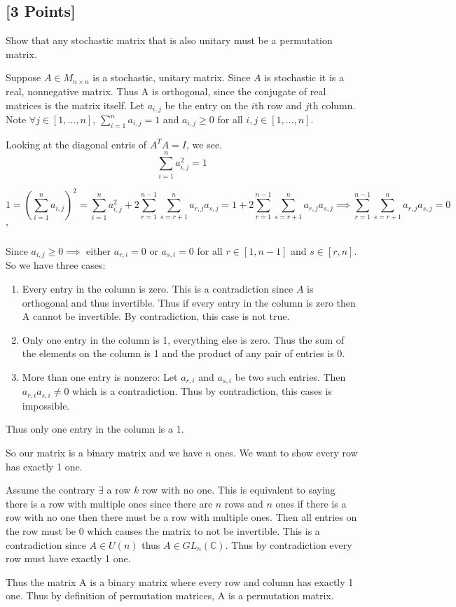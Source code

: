 \documentclass[11pt]{article}
\begin{document}
\subsection{[3 Points]} Show that any stochastic matrix that is also unitary must be a permutation matrix. 

\begin{solution}
	Suppose $A \in M_{n \times n}$ is a stochastic, unitary matrix. Since $A$ is stochastic it is a real, nonnegative matrix. Thus A is orthogonal, since the conjugate of real matrices is the matrix itself. Let $a_{i, j}$ be the entry on the $i$th row and $j$th column. Note $\forall j \in [1, \dots, n]$, $\sum_{i = 1}^{n} a_{i, j} = 1$ and $a_{i, j} \geq 0$ for all $i, j \in [1, \dots, n]$. 
	
	Looking at the diagonal entris of $A^T A = I$, we see.  
	\[\sum_{i = 1}^n a^2_{i, j} = 1\]

	\[1 = \left(\sum_{i = 1}^{n} a_{i, j}\right)^2 = \sum_{i = 1}^n a^2_{i, j} + 2\sum_{r = 1}^{n - 1} \sum_{s = r + 1}^{n} a_{r, j} a_{s, j} = 1 + 2\sum_{r = 1}^{n - 1} \sum_{s = r + 1}^{n} a_{r, j} a_{s, j} \implies \sum_{r = 1}^{n - 1} \sum_{s = r + 1}^{n} a_{r, j} a_{s, j} = 0\]'

	Since $a_{i, j} \geq 0 \implies $ either $a_{r, i} = 0$ or $a_{s, i} = 0$ for all $r \in [1, n - 1]$ and $s \in [r, n]$. So we have three cases: 

	\begin{enumerate}
		\item Every entry in the column is zero. This is a contradiction since $A$ is orthogonal and thus invertible. Thus if every entry in the column is zero then A cannot be invertible. By contradiction, this case is not true. 
		\item Only one entry in the column is 1, everything else is zero. Thus the sum of the elements on the column is 1 and the product of any pair of entries is 0.   
		\item More than one entry is nonzero: Let $a_{r, i}$ and $a_{s, i}$ be two such entries. Then $a_{r, i} a_{s, i} \neq 0$ which is a contradiction. Thus by contradiction, this cases is impossible.  
	\end{enumerate}

	Thus only one entry in the column is a 1. 

	So our matrix is a binary matrix and we have $n$ ones. We want to show every row has exactly 1 one. 
	
	Assume the contrary $\exists$ a row $k$ row with no one. This is equivalent to saying there is a row with multiple ones since there are $n$ rows and $n$ ones if there is a row with no one then there must be a row with multiple ones. Then all entries on the row must be 0 which causes the matrix to not be invertible. This is a contradiction since $A \in U(n)$ thus $A \in GL_n(\mathbb{C})$. Thus by contradiction every row must have exactly 1 one.
	
	Thus the matrix A is a binary matrix where every row and column has exactly 1 one. Thus by definition of permutation matrices, A is a permutation matrix.  
	
\end{solution}
\end{document}
